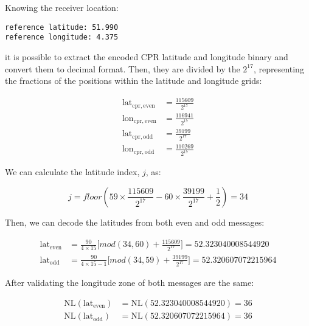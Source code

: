 Knowing the receiver location:

\begin{verbatim}
reference latitude: 51.990
reference longitude: 4.375
\end{verbatim}


it is possible to extract the encoded CPR latitude and longitude binary and convert them to decimal format. Then, they are divided by the $2^{17}$, representing the fractions of the positions within the latitude and longitude grids:

\begin{equation}
  \begin{split}
    \mathrm{lat}_\mathrm{cpr,even} &= \frac{115609}{2^{17}} \\
    \mathrm{lon}_\mathrm{cpr,even} &= \frac{116941}{2^{17}} \\
    \mathrm{lat}_\mathrm{cpr,odd} &=  \frac{39199}{2^{17}} \\
    \mathrm{lon}_\mathrm{cpr,odd} &=  \frac{110269}{2^{17}}
  \end{split}
\end{equation}

We can calculate the latitude index, $j$, as:

\begin{equation}
  j = floor \left( 59 \times \frac{115609}{2^{17}} - 60 \times \frac{39199}{2^{17}} + \frac{1}{2}  \right) = 34
\end{equation}

Then, we can decode the latitudes from both even and odd messages:

\begin{equation}
  \begin{split}
    \mathrm{lat}_\mathrm{even} &= \frac{90}{4 \times 15} \Big[ mod(34, 60) + \frac{115609}{2^{17}} \Big] = 52.323040008544920 \\
    \mathrm{lat}_\mathrm{odd} &= \frac{90}{4 \times 15 - 1} \Big[ mod(34, 59) + \frac{39199}{2^{17}} \Big] = 52.320607072215964
  \end{split}
\end{equation}

After validating the longitude zone of both messages are the same:

\begin{equation}
  \begin{split}
    \mathrm{NL}(\mathrm{lat}_\mathrm{even}) &= \mathrm{NL}(52.323040008544920) = 36 \\
    \mathrm{NL}(\mathrm{lat}_\mathrm{odd}) &= \mathrm{NL}(52.320607072215964) = 36
  \end{split}
\end{equation}


